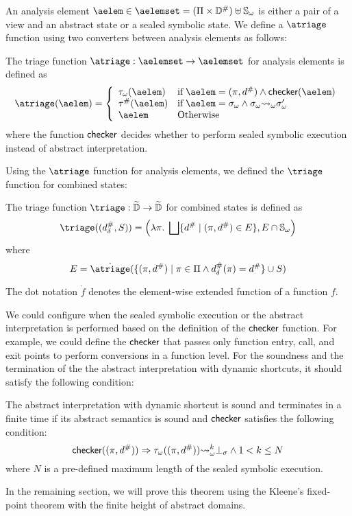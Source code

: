 An analysis element $\aelem \in \aelemset = (\viewset \times \absdom) \uplus
\symbstset$ is either a pair of a view and an abstract state or a sealed
symbolic state.  We define a $\atriage$ function using two converters between
analysis elements as follows:
\begin{definition}[$\atriage$]
  The triage function $\atriage: \aelemset \rightarrow \aelemset$ for analysis
  elements is defined as
  \[
    \atriage(\aelem) = \left\{
      \begin{array}{ll}
        \asconverter(\aelem)
        & \text{if} \; \aelem = (\view, \abselem) \wedge \checker(\aelem)\\
        \saconverter(\aelem)
        & \text{if} \; \aelem = \symbst \wedge \symbst \symbtrans \symbst'\\
        \aelem
        & \text{Otherwise}
      \end{array}
    \right.
  \]
  where the function $\textsf{checker}$ decides whether to perform sealed symbolic
  execution instead of abstract interpretation.
\end{definition}
Using the $\atriage$ function for analysis elements, we defined the $\triage$
function for combined states:
\begin{definition}[$\triage$]
  The triage function $\triage: \combdom \rightarrow \combdom$ for combined
  states is defined as
  \[
    \triage((\sabselem, S)) = \left(
      \lambda \view. \;  \bigjoin \{ \abselem \mid (\view, \abselem) \in E \},
      E \cap \symbstset
    \right)
  \]
  where
  \[
    E = \dot{\atriage}(\{ (\view, \abselem) \mid \view \in \viewset \wedge
    \sabselem(\view) = \abselem \} \cup S)
  \]
\end{definition}
The dot notation $\dot{f}$ denotes the element-wise extended function of a
function $f$.

We could configure when the sealed symbolic execution or the abstract
interpretation is performed based on the definition of the $\textsf{checker}$ function.
For example, we could define the $\textsf{checker}$ that passes only function entry,
call, and exit points to perform conversions in a function level.  For the
soundness and the termination of the the abstract interpretation with dynamic
shortcuts, it should satisfy the following condition:
\begin{theorem}\label{theorem:shortcut}
  The abstract interpretation with dynamic shortcut is sound and terminates in a
  finite time if its abstract semantics is sound and $\textsf{checker}$ satisfies the
  following condition:
  \[
    \textsf{checker}((\pi, {d}^{\#})) \Rightarrow {\tau}_\omega((\pi, {d}^{\#}))
    {\leadsto}_\omega^k \bot_\sigma \wedge 1 < k \leq N
  \]
  where $N$ is a pre-defined maximum length of the sealed symbolic execution.
\end{theorem}

In the remaining section, we will prove this theorem using the Kleene's
fixed-point theorem with the finite height of abstract domains.
